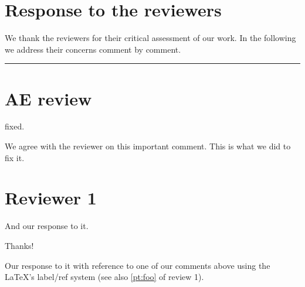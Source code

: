 \documentclass{response}
\begin{document}
\section*{Response to the reviewers}
We thank the reviewers for their critical assessment of our work. 
In the following we address their concerns comment by comment. 
\bigskip
\hrule
\section{AE review}
\begin{comment}
Great but writing needs to be improved! Sure!!!!!!!!!!!!!!!!!!!!!!!!!!!!!!!!!!!!!!!!!!!!!!!!!!
\end{comment}
\begin{response}
	fixed.
\end{response}
\begin{comment}
	Good job!
	\label{pt:foo}
\end{comment}

\begin{response}
	We agree with the reviewer on this important comment. This is what we did to
	fix it. 
\end{response}

\begin{comment}
	good
	\label{pt:bar}
\end{comment}

\section{Reviewer 1}

\begin{response}
	And our response to it.
\end{response}

\begin{comment}
	I argue to accept your paper right now!
\end{comment}

\begin{response}
	Thanks!
\end{response}

\begin{comment}
	This is the second comment of Reviewer.
\end{comment}

\begin{response}
	Our response to it with reference to one of our comments above using the \LaTeX's 
	label/ref system (see also \ref{pt:foo} of review 1).
\end{response}
\end{document}
